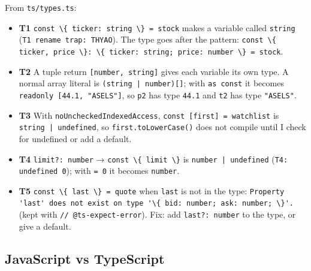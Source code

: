 \documentclass[
  11pt,
]{article}
\newcommand{\passthrough}[1]{#1}
\providecommand{\tightlist}{%
  \setlength{\itemsep}{0pt}\setlength{\parskip}{0pt}}
\begin{document}
From \passthrough{\lstinline!ts/types.ts!}:

\begin{itemize}
\tightlist
\item
  \textbf{T1}
  \passthrough{\lstinline!const \{ ticker: string \} = stock!} makes a
  variable called \passthrough{\lstinline!string!}
  (\passthrough{\lstinline!T1 rename trap: THYAO!}). The type goes after
  the pattern:
  \passthrough{\lstinline!const \{ ticker, price \}: \{ ticker: string; price: number \} = stock!}.
\item
  \textbf{T2} A tuple return \passthrough{\lstinline![number, string]!}
  gives each variable its own type. A normal array literal is
  \passthrough{\lstinline!(string | number)[]!}; with
  \passthrough{\lstinline!as const!} it becomes
  \passthrough{\lstinline!readonly [44.1, "ASELS"]!}, so
  \passthrough{\lstinline!p2!} has type \passthrough{\lstinline!44.1!}
  and \passthrough{\lstinline!t2!} has type
  \passthrough{\lstinline!"ASELS"!}.
\item
  \textbf{T3} With \passthrough{\lstinline!noUncheckedIndexedAccess!},
  \passthrough{\lstinline!const [first] = watchlist!} is
  \passthrough{\lstinline!string | undefined!}, so
  \passthrough{\lstinline!first.toLowerCase()!} does not compile until I
  check for undefined or add a default.
\item
  \textbf{T4} \passthrough{\lstinline!limit?: number!} →
  \passthrough{\lstinline!const \{ limit \}!} is
  \passthrough{\lstinline!number | undefined!}
  (\passthrough{\lstinline!T4: undefined 0!}); with
  \passthrough{\lstinline!= 0!} it becomes
  \passthrough{\lstinline!number!}.
\item
  \textbf{T5} \passthrough{\lstinline!const \{ last \} = quote!} when
  \passthrough{\lstinline!last!} is not in the type:
  \passthrough{\lstinline!Property 'last' does not exist on type '\{ bid: number; ask: number; \}'.!}
  (kept with \passthrough{\lstinline!// @ts-expect-error!}). Fix: add
  \passthrough{\lstinline!last?: number!} to the type, or give a
  default.
\end{itemize}

\subsection{JavaScript vs TypeScript}\label{javascript-vs-typescript}
\end{document}
